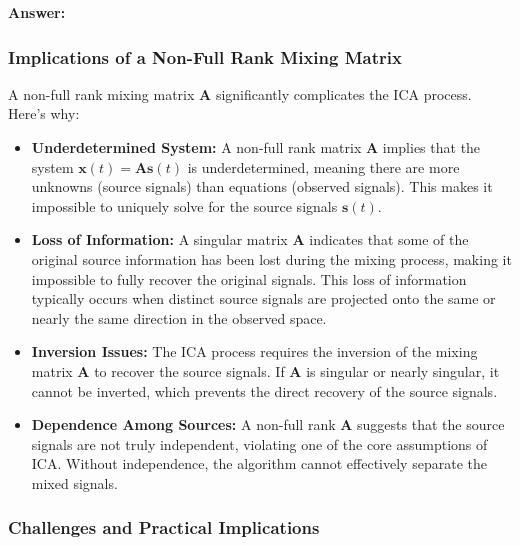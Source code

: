 \documentclass{exam}
\begin{document}
\textbf{Answer:}

\subsubsection{Implications of a Non-Full Rank Mixing Matrix}

A non-full rank mixing matrix \( \mathbf{A} \) significantly complicates the ICA process. Here’s why:

\begin{itemize}
    \item \textbf{Underdetermined System:} A non-full rank matrix \( \mathbf{A} \) implies that the system \( \mathbf{x}(t) = \mathbf{A} \mathbf{s}(t) \) is underdetermined, meaning there are more unknowns (source signals) than equations (observed signals). This makes it impossible to uniquely solve for the source signals \( \mathbf{s}(t) \).
    
    \item \textbf{Loss of Information:} A singular matrix \( \mathbf{A} \) indicates that some of the original source information has been lost during the mixing process, making it impossible to fully recover the original signals. This loss of information typically occurs when distinct source signals are projected onto the same or nearly the same direction in the observed space.
    
    \item \textbf{Inversion Issues:} The ICA process requires the inversion of the mixing matrix \( \mathbf{A} \) to recover the source signals. If \( \mathbf{A} \) is singular or nearly singular, it cannot be inverted, which prevents the direct recovery of the source signals.
    
    \item \textbf{Dependence Among Sources:} A non-full rank \( \mathbf{A} \) suggests that the source signals are not truly independent, violating one of the core assumptions of ICA. Without independence, the algorithm cannot effectively separate the mixed signals.
\end{itemize}

\subsubsection{Challenges and Practical Implications}
\end{document}
